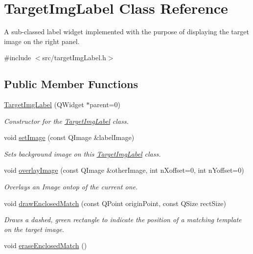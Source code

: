 \hypertarget{classTargetImgLabel}{
\section{TargetImgLabel Class Reference}
\label{classTargetImgLabel}
}


A sub-\/classed label widget implemented with the purpose of displaying the target image on the right panel.  


{\ttfamily \#include $<$src/targetImgLabel.h$>$}\subsection*{Public Member Functions}
\begin{DoxyCompactItemize}
\item 
\hypertarget{classTargetImgLabel_acb3dcfa8b9616be0a355c90db81aaba2}{
\hyperlink{classTargetImgLabel_acb3dcfa8b9616be0a355c90db81aaba2}{TargetImgLabel} (QWidget $\ast$parent=0)}
\label{classTargetImgLabel_acb3dcfa8b9616be0a355c90db81aaba2}

\begin{DoxyCompactList}\small\item\em Constructor for the \hyperlink{classTargetImgLabel}{TargetImgLabel} class. \item\end{DoxyCompactList}\item 
void \hyperlink{classTargetImgLabel_a2ec40d8850e3d9cc4d5c9984412c0cfb}{setImage} (const QImage \&labelImage)
\begin{DoxyCompactList}\small\item\em Sets background image on this \hyperlink{classTargetImgLabel}{TargetImgLabel} class. \item\end{DoxyCompactList}\item 
void \hyperlink{classTargetImgLabel_a09dbad77c225942d7a604e06a119f60d}{overlayImage} (const QImage \&otherImage, int nXoffset=0, int nYoffset=0)
\begin{DoxyCompactList}\small\item\em Overlays an Image ontop of the current one. \item\end{DoxyCompactList}\item 
void \hyperlink{classTargetImgLabel_ab835774d14df1e93cb0fd010d1a2e699}{drawEnclosedMatch} (const QPoint originPoint, const QSize rectSize)
\begin{DoxyCompactList}\small\item\em Draws a dashed, green rectangle to indicate the position of a matching template on the target image. \item\end{DoxyCompactList}\item 
\hypertarget{classTargetImgLabel_ad060485d97c7797339243b23f3ea05ef}{
void \hyperlink{classTargetImgLabel_ad060485d97c7797339243b23f3ea05ef}{eraseEnclosedMatch} ()}
\label{classTargetImgLabel_ad060485d97c7797339243b23f3ea05ef}


\end{DoxyCompactItemize}
